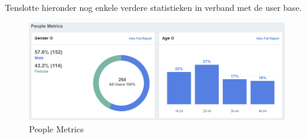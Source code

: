 \documentclass[11pt, letterpaper, oneside]{article}
\begin{document}
	Tenslotte hieronder nog enkele verdere statistieken in verband met de user base.

	\begin{figure}[h]
		\centering
		\includegraphics[width=0.7\linewidth]{./figuren/people-metrics}
		\caption{People Metrics}
		\label{people-metrics}
	\end{figure}
\end{document}
